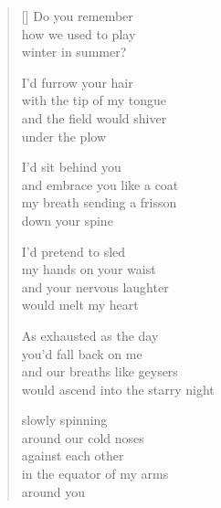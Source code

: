 \documentclass[12pt,a4paper]{article}
\begin{document}

\newpage

\poemtitle{}

\settowidth{\versewidth}{would ascend into the starry night}

\bigskip

\begin{verse}[\versewidth]
  Do you remember \\
  how we used to play \\
  winter in summer?

  I'd furrow your hair \\
  with the tip of my tongue \\
  and the field would shiver \\
  under the plow

  I'd sit behind you \\
  and embrace you like a coat \\
  my breath sending a frisson \\
  down your spine

  I'd pretend to sled \\
  my hands on your waist \\
  and your nervous laughter \\
  would melt my heart

  As exhausted as the day \\
  you'd fall back on me \\
  and our breaths like geysers \\
  would ascend into the starry night

  slowly spinning \\
  around our cold noses \\
  against each other \\
  in the equator of my arms \\
  around you
\end{verse}


\newpage

\poemtitle{}

\settowidth{\versewidth}{the infinite kaleidoscope}

\bigskip
\end{document}
